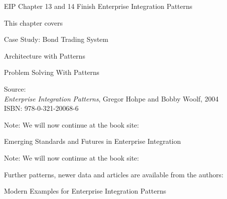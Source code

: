 \documentclass[Screen16to9,17pt]{foils}
\begin{document}

EIP Chapter 13 and 14
Finish Enterprise Integration Patterns


This chapter covers
\begin{list2}
\item Case Study: Bond Trading System
\item Architecture with Patterns
\item Problem Solving With Patterns
\end{list2}

Source: {\footnotesize\\
\emph{Enterprise Integration Patterns}, Gregor Hohpe and Bobby Woolf, 2004\\
ISBN: 978-0-321-20068-6}

Note: We will now continue at the book site:\\
{\footnotesize{}}



\begin{list2}
\item Emerging Standards and Futures in Enterprise Integration
\end{list2}

Note: We will now continue at the book site:\\
{\footnotesize{}}



\begin{quote}

\end{quote}

\begin{list2}
  \item Further patterns, newer data and articles are available from the authors:\\
\end{list2}




Modern Examples for Enterprise Integration Patterns\\
{\footnotesize{}}
\end{document}
